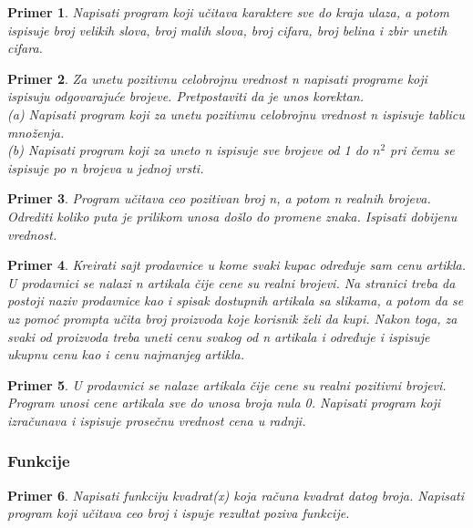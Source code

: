 \documentclass[a4paper]{article}
\newtheorem{primer}{Primer}[section]
\begin{document}
\begin{primer}
Napisati program koji učitava karaktere sve do kraja ulaza,
a potom ispisuje broj velikih slova, broj malih slova, broj cifara, broj belina i zbir
unetih cifara.
\end{primer}

\begin{primer}
Za unetu pozitivnu celobrojnu vrednost n napisati programe
koji ispisuju odgovarajuće brojeve. Pretpostaviti da je unos korektan.\\
(a) Napisati program koji za unetu pozitivnu celobrojnu vrednost n ispisuje
tablicu množenja.\\
(b) Napisati program koji za uneto n ispisuje sve brojeve od 1 do $n^2$ pri čemu se ispisuje po n brojeva u jednoj vrsti.\\
\end{primer}


\begin{primer}
Program učitava ceo pozitivan broj n, a potom n realnih
brojeva. Odrediti koliko puta je prilikom unosa došlo do promene znaka. Ispisati
dobijenu vrednost.
\end{primer}

\begin{primer}
Kreirati sajt prodavnice u kome svaki kupac određuje sam cenu artikla. U prodavnici se nalazi n artikala čije cene su realni brojevi. Na stranici treba da postoji naziv prodavnice kao i spisak dostupnih artikala sa slikama, a potom da se uz pomoć prompta učita broj proizvoda koje korisnik želi da kupi. Nakon toga, za svaki od proizvoda treba uneti cenu svakog od n artikala i određuje i ispisuje ukupnu cenu kao i cenu najmanjeg artikla.
\end{primer}

\begin{primer}
U prodavnici se nalaze artikala čije cene su realni pozitivni
brojevi. Program unosi cene artikala sve do unosa broja nula 0. Napisati program
koji izračunava i ispisuje prosečnu vrednost cena u radnji.
\end{primer}

\subsubsection{Funkcije}

\begin{primer}
Napisati funkciju kvadrat(x) koja računa kvadrat
datog broja. Napisati program koji učitava ceo broj i ispuje rezultat poziva
funkcije.
\end{primer}
\end{document}
